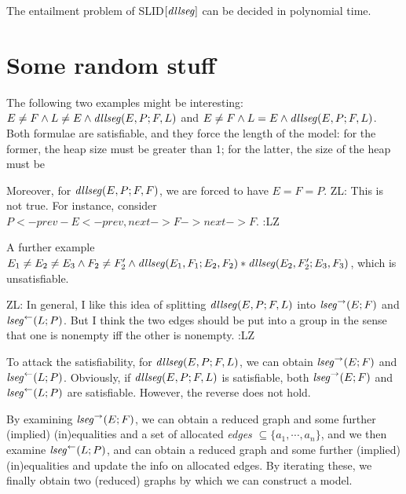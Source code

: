 \documentclass{llncs}
\newcommand{\zhilin}[1]{\color{red} {ZL: #1 :LZ} \color{black}}
\begin{document}
\begin{theorem}
The entailment problem of SLID$[\mathit{dllseg}]$ can be decided in polynomial time.
\end{theorem}






\appendix

\section{Some random stuff}
\begin{example} \label{example:tl}
The following two examples might be interesting:
$E\neq F \wedge L\neq E \wedge \mathit{dllseg}(E, P ; F, L)$ and $E\neq F\wedge L= E  \wedge \mathit{dllseg}(E, P ; F, L)$. Both formulae are satisfiable, and they force the length of the model: for the former, the heap size must be greater than 1; for the latter, the size of the heap must be   

Moreover, for $\mathit{dllseg}(E, P; F, F)$, we are forced to have $E=F=P$. \zhilin{This is not true. For instance, consider $P<- prev - E <-prev,next -> F ->next ->F$.}

A further example $E_1\neq E_2\neq E_3\wedge F_2\neq F_2'\wedge \mathit{dllseg}(E_1, F_1; E_2, F_2)\ast \mathit{dllseg}(E_2, F'_2; E_3, F_3)$, which is unsatisfiable. 
\end{example}

\zhilin{In general, I like this idea of splitting $\mathit{dllseg}(E,P; F, L)$ into $\mathit{lseg}^\rightarrow(E;F)$ and $\mathit{lseg}^\leftarrow(L; P)$. But I think the two edges should be put into a group in the sense that one is nonempty iff the other is nonempty.}

To attack the satisfiability, for $\mathit{dllseg}(E, P; F, L)$, we can obtain $\mathit{lseg}^{\rightarrow}(E; F)$ and $\mathit{lseg}^{\leftarrow}(L; P)$. Obviously, if $\mathit{dllseg}(E, P; F, L)$ is satisfiable, both $\mathit{lseg}^{\rightarrow}(E; F)$ and $\mathit{lseg}^{\leftarrow}(L; P)$ are satisfiable. However, the reverse does not hold. 

By examining $\mathit{lseg}^{\rightarrow}(E; F)$, we can obtain a reduced graph and some further (implied) (in)equalities and a set of allocated \emph{edges} $\subseteq\{a_1, \cdots, a_n\}$, and we then examine $\mathit{lseg}^{\leftarrow}(L; P)$, and can obtain a reduced graph and some further (implied) (in)equalities and update the info on allocated edges. By iterating these, we finally obtain two (reduced) graphs by which we can construct a model. 
\end{document}
